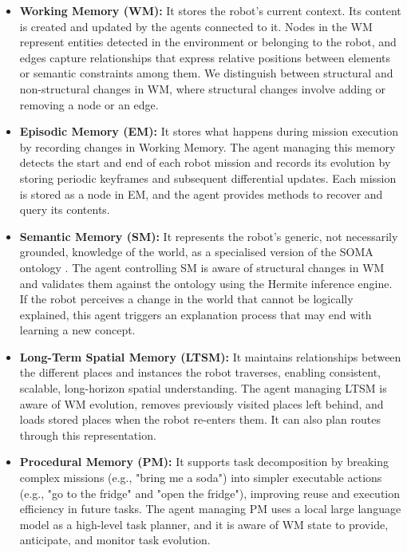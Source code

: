 \documentclass[a4paper, twoside]{article}
\begin{document}
\begin{itemize}
    \item \textbf{Working Memory (WM):} It stores the robot's current context. Its content is created and updated by the agents connected to it. Nodes in the WM represent entities detected in the environment or belonging to the robot, and edges capture relationships that express relative positions between elements or semantic constraints among them. We distinguish between structural and non-structural changes in WM, where structural changes involve adding or removing a node or an edge.
    
    \item \textbf{Episodic Memory (EM):} It stores what happens during mission execution by recording changes in Working Memory. The agent managing this memory detects the start and end of each robot mission and records its evolution by storing periodic keyframes and subsequent differential updates. Each mission is stored as a node in EM, and the agent provides methods to recover and query its contents.
    
    \item \textbf{Semantic Memory (SM):} It represents the robot's generic, not necessarily grounded, knowledge of the world, as a specialised version of the SOMA ontology \cite{bessler2021foundations}. The agent controlling SM is aware of structural changes in WM and validates them against the ontology using the Hermite inference engine. If the robot perceives a change in the world that cannot be logically explained, this agent triggers an explanation process that may end with learning a new concept.
    
    \item \textbf{Long-Term Spatial Memory (LTSM):} It maintains relationships between the different places and instances the robot traverses, enabling consistent, scalable, long-horizon spatial understanding. The agent managing LTSM is aware of WM evolution, removes previously visited places left behind, and loads stored places when the robot re-enters them. It can also plan routes through this representation.
    
    \item \textbf{Procedural Memory (PM):} It supports task decomposition by breaking complex missions (e.g., "bring me a soda") into simpler executable actions (e.g., "go to the fridge" and "open the fridge"), improving reuse and execution efficiency in future tasks. The agent managing PM uses a local large language model as a high-level task planner, and it is aware of WM state to provide, anticipate, and monitor task evolution.
\end{itemize}
\end{document}
